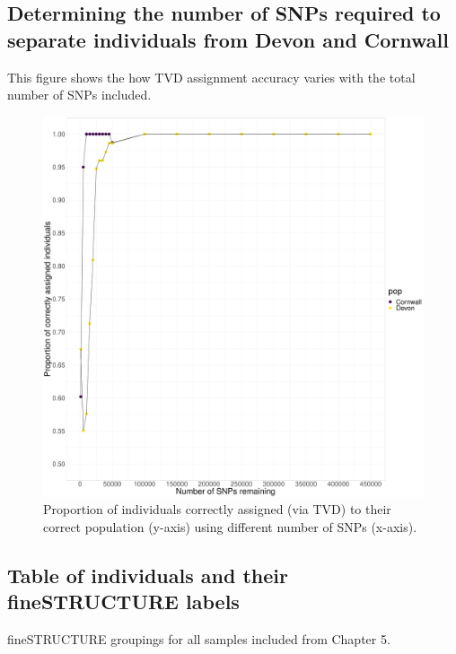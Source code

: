 \subsection{Determining the number of SNPs required to separate individuals from Devon and Cornwall} 
\label{sec:SNP_Count_Assignment_DevCorn}

This figure shows the how TVD assignment accuracy varies with the total number of SNPs included.


\begin{figure}[htp]
    \centering
    \includegraphics[width=1.0\textwidth]{../images/appendix/Devon_Cornwall_TVD_reduced.pdf}
    \caption{Proportion of individuals correctly assigned (via TVD) to their correct population (y-axis) using different number of SNPs (x-axis).}
    \label{fig:Devon_Cornwall_TVD_reduced_assignment}
\end{figure}


\subsection{Table of individuals and their fineSTRUCTURE labels} 
\label{sec:fs_slavs_group}

fineSTRUCTURE groupings for all samples included from Chapter 5.

\begingroup\fontsize{9}{11}\selectfont

